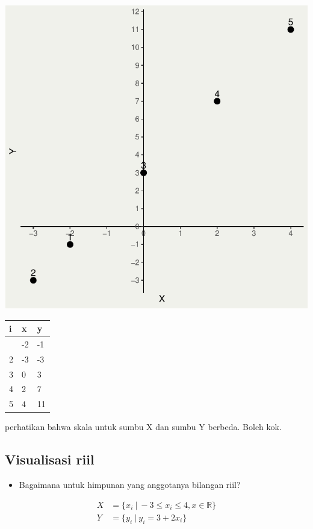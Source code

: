 \documentclass[
  letterpaper,
  DIV=11,
  numbers=noendperiod]{scrartcl}
\providecommand{\tightlist}{%
  \setlength{\itemsep}{0pt}\setlength{\parskip}{0pt}}\usepackage{longtable,booktabs,array}
\begin{document}
\includegraphics{index_files/figure-pdf/unnamed-chunk-2-1.pdf}

\begin{longtable}[]{@{}lll@{}}
\toprule\noalign{}
i & x & y \\
\midrule\noalign{}
\endhead
\bottomrule\noalign{}
\endlastfoot
1 & -2 & -1 \\
2 & -3 & -3 \\
3 & 0 & 3 \\
4 & 2 & 7 \\
5 & 4 & 11 \\
\end{longtable}

perhatikan bahwa skala untuk sumbu X dan sumbu Y berbeda. Boleh kok.

\subsection{Visualisasi riil}\label{visualisasi-riil}

\begin{itemize}
\tightlist
\item
  Bagaimana untuk himpunan yang anggotanya bilangan riil?
\end{itemize}

\[
\begin{align}
X&=\{x_i \ | \ -3 \leq x_i \leq 4, x \in \mathbb{R}\} \\
Y&=\{y_i \ | \  y_i=3+2x_i\}
\end{align}
\]
\end{document}
